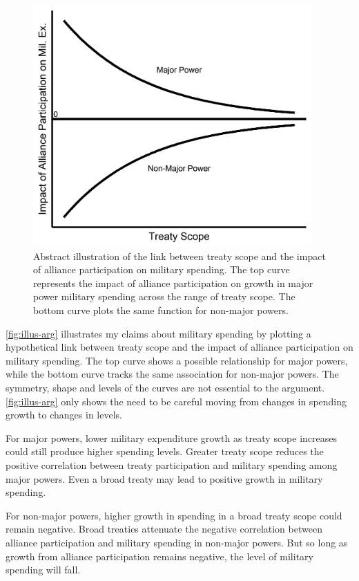 \documentclass[12pt]{article}
\begin{document}
\begin{figure}[htbp]
	\centering
		\includegraphics[width=0.95\textwidth]{../figures/illus-arg.png}
	\caption{Abstract illustration of the link between treaty scope and the impact of alliance participation on military spending.
	The top curve represents the impact of alliance participation on growth in major power military spending across the range of treaty scope.
	The bottom curve plots the same function for non-major powers.}
	\label{fig:illus-arg}
\end{figure}


\autoref{fig:illus-arg} illustrates my claims about military spending by plotting a hypothetical link between treaty scope and the impact of alliance participation on military spending. 
The top curve shows a possible relationship for major powers, while the bottom curve tracks the same association for non-major powers. 
The symmetry, shape and levels of the curves are not essential to the argument.
\autoref{fig:illus-arg} only shows the need to be careful moving from changes in spending growth to changes in levels. 


For major powers, lower military expenditure growth as treaty scope increases could still produce higher spending levels. 
Greater treaty scope reduces the positive correlation between treaty participation and military spending among major powers. 
Even a broad treaty may lead to positive growth in military spending. 


For non-major powers, higher growth in spending in a broad treaty scope could remain negative. 
Broad treaties attenuate the negative correlation between alliance participation and military spending in non-major powers. 
But so long as growth from alliance participation remains negative, the level of military spending will fall. 
\end{document}
